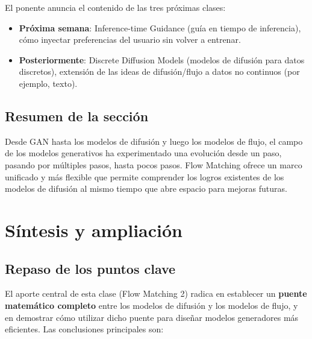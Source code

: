 \documentclass[a4paper]{article}
\begin{document}
El ponente anuncia el contenido de las tres próximas clases:
\begin{itemize}
    \item \textbf{Próxima semana}: Inference-time Guidance (guía en tiempo de inferencia), cómo inyectar preferencias del usuario sin volver a entrenar.
    \item \textbf{Posteriormente}: Discrete Diffusion Models (modelos de difusión para datos discretos), extensión de las ideas de difusión/flujo a datos no continuos (por ejemplo, texto).
\end{itemize}

\subsection{Resumen de la sección}

Desde GAN hasta los modelos de difusión y luego los modelos de flujo, el campo de los modelos generativos ha experimentado una evolución desde un paso, pasando por múltiples pasos, hasta pocos pasos. Flow Matching ofrece un marco unificado y más flexible que permite comprender los logros existentes de los modelos de difusión al mismo tiempo que abre espacio para mejoras futuras.
\section{Síntesis y ampliación}

\subsection{Repaso de los puntos clave}

El aporte central de esta clase (Flow Matching 2) radica en establecer un \textbf{puente matemático completo} entre los modelos de difusión y los modelos de flujo, y en demostrar cómo utilizar dicho puente para diseñar modelos generadores más eficientes. Las conclusiones principales son:
\end{document}
